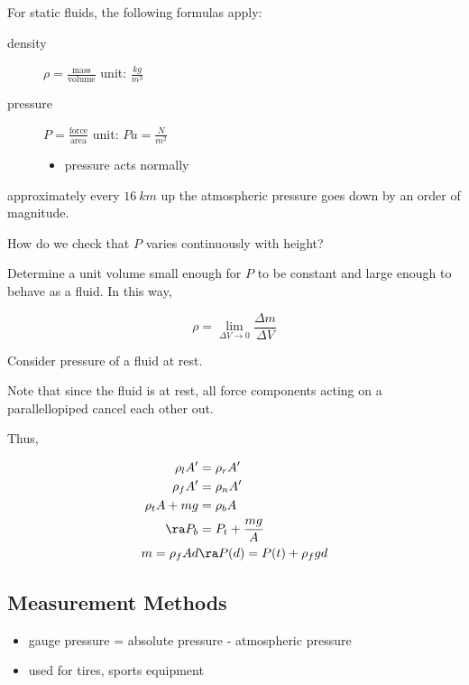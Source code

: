 \documentclass[11pt]{scrartcl}
\begin{document}
For static fluids, the following formulas apply:
\begin{description}

\item[density] \(\rho = \frac{\text{mass}}{\text{volume}}\) unit: \(\frac{kg}{m^{3}}\)
  
\item[pressure] \(P = \frac{\text{force}}{\text{area}}\) unit: \(Pa = \frac{N}{m^{2}}\)
  \begin{itemize}
  \item pressure acts normally
  \end{itemize}

\end{description}

\begin{example}

  approximately every \(16\ km\) up the atmospheric pressure goes down
  by an order of magnitude. 

\end{example}
\begin{ques*}
  How do we check that \(P\) varies continuously with height?
\end{ques*}

\begin{answer*}

  Determine a unit volume small enough for \(P\) to be constant and
  large enough to behave as a fluid. In this way,

  \[\rho = \lim_{\Delta V \to 0}\frac{\Delta m}{\Delta V}\]

\end{answer*}

Consider pressure of a fluid at rest.

Note that since the fluid is at rest, all force components acting on a
parallellopiped cancel each other out.

Thus,

\begin{align}
  \rho_{l}A' &= \rho_{r}A'\\
  \rho_{f}A' &= \rho_{n}A'\\
  \rho_{t}A + mg &= \rho_{b}A\\
  \ra P_{b} &= P_{t} + \frac{mg}{A}\\
  m = \rho_{f}Ad &\ra P(d) = P(t) + \rho_{f}gd
\end{align}

\subsection{Measurement Methods}
\label{subsec:meas}

\begin{itemize}
\item gauge pressure = absolute pressure - atmospheric pressure
\item used for tires, sports equipment
\end{itemize}
\end{document}

